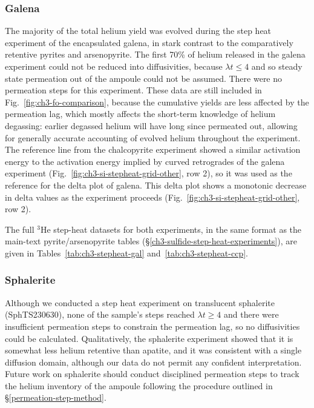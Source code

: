 \subsubsection*{Galena}
The majority of the total helium yield was evolved during the step heat
experiment of the encapsulated galena, in stark contrast to the
comparatively retentive pyrites and arsenopyrite. The first 70\% of helium
released in the galena experiment could not be reduced into diffusivities, because $\lambda t \leq 4$ and so 
steady state permeation out of the ampoule could not be assumed. There were no permeation steps for this experiment. 
These data are still included in Fig.~\ref{fig:ch3-fo-comparison}, because the cumulative yields are less affected by
the permeation lag, which mostly affects the short-term knowledge of helium degassing: earlier degassed helium will have long since 
permeated out, allowing for generally accurate accounting of evolved helium throughout the experiment. 
The reference line from the chalcopyrite experiment showed a similar activation energy to
the activation energy implied by curved retrogrades of the galena
experiment (Fig.~\ref{fig:ch3-si-stepheat-grid-other}, row 2), so it was used as the reference for the delta
plot of galena. This delta plot shows a monotonic decrease in delta
values as the experiment proceeds (Fig.~\ref{fig:ch3-si-stepheat-grid-other}, row 2).

The full $^3$He step-heat datasets for both experiments, in the same
format as the main-text pyrite/arsenopyrite tables
(\S\ref{ch3-sulfide-step-heat-experiments}), are given in
Tables~\ref{tab:ch3-stepheat-gal} and~\ref{tab:ch3-stepheat-ccp}.

\subsubsection*{Sphalerite}
Although we conducted a step heat experiment on translucent sphalerite (SphTS230630), none of the sample's steps reached $\lambda t \geq 4$ and there were insufficient permeation
steps to constrain the permeation lag, so no diffusivities could be calculated. Qualitatively, the sphalerite experiment showed that it is somewhat less helium retentive than apatite, 
and it was consistent with a single diffusion domain, although our data do not permit any confident interpretation. 
Future work on sphalerite should conduct disciplined permeation steps to track the helium inventory of the ampoule 
following the procedure outlined in \S\ref{permeation-step-method}.

